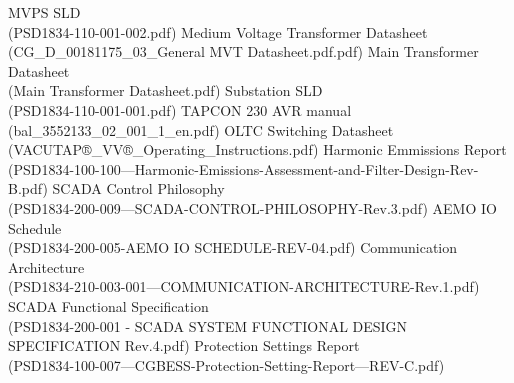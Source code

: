 \renewcommand\bibname{References}

\begin{thebibliography}{99}	
	MVPS SLD\\
	(PSD1834-110-001-002.pdf)
	Medium Voltage Transformer Datasheet\\
	(CG_D_00181175_03_General MVT Datasheet.pdf.pdf)
	 Main Transformer Datasheet\\
	(Main Transformer Datasheet.pdf)
	 Substation SLD\\
	(PSD1834-110-001-001.pdf)
	TAPCON 230 AVR manual\\
	(bal_3552133_02_001_1_en.pdf)
	 OLTC Switching Datasheet\\
	(VACUTAP®_VV®_Operating_Instructions.pdf)
	 Harmonic Emmissions Report\\
	(PSD1834-100-100---Harmonic-Emissions-Assessment-and-Filter-Design-Rev-B.pdf)
	 SCADA Control Philosophy\\
	(PSD1834-200-009---SCADA-CONTROL-PHILOSOPHY-Rev.3.pdf)
	 AEMO IO Schedule\\
	(PSD1834-200-005-AEMO IO SCHEDULE-REV-04.pdf)
	 Communication Architecture\\
	(PSD1834-210-003-001---COMMUNICATION-ARCHITECTURE-Rev.1.pdf)
	 SCADA Functional Specification\\
	(PSD1834-200-001 - SCADA SYSTEM FUNCTIONAL DESIGN SPECIFICATION Rev.4.pdf)
	 Protection Settings Report\\
	(PSD1834-100-007---CGBESS-Protection-Setting-Report---REV-C.pdf)



\end{thebibliography}